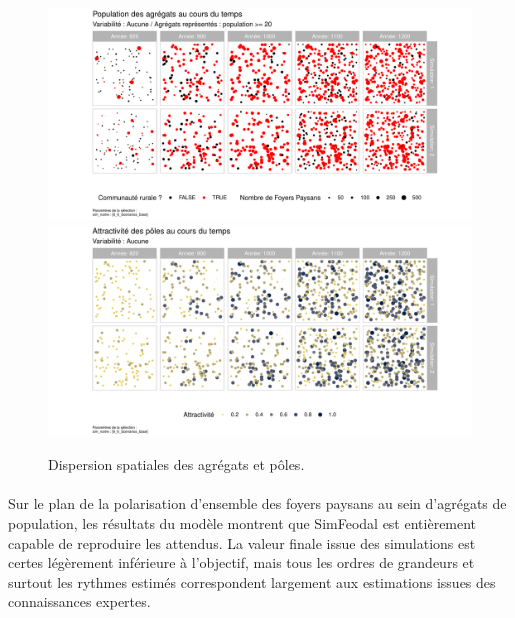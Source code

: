 
\begin{figure}[H]
	\centering
	\includegraphics[width=\linewidth]{img/results_6_6/Agregats_Carte_Haut.pdf}
	\includegraphics[width=\linewidth]{img/results_6_6/Poles_Carte_Haut.pdf}
	\caption{Dispersion spatiales des agrégats et pôles.}
	\label{fig:results-carte-agregats_poles}
\end{figure}

\bigskip
\paragraph[Conclusion intermédiaire]{}
Sur le plan de la polarisation d'ensemble des foyers paysans au sein d'agrégats de population, les résultats du modèle montrent que SimFeodal est entièrement capable de reproduire les attendus.
La valeur finale issue des simulations est certes légèrement inférieure à l'objectif, mais tous les ordres de grandeurs et surtout les rythmes estimés correspondent largement aux estimations issues des connaissances expertes.

